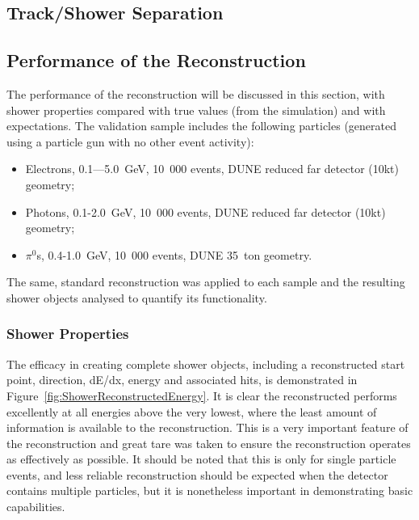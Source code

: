 \subsection{Track/Shower Separation}\label{sec:TrackShowerSeparation}

\subsection{Performance of the Reconstruction}\label{sec:ReconstructionPerformance}

The performance of the reconstruction will be discussed in this section, with shower properties compared with true values (from the simulation) and with expectations.  The validation sample includes the following particles (generated using a particle gun with no other event activity):
\begin{itemize}
  \item Electrons, 0.1—5.0~GeV, 10~000 events, DUNE reduced far detector (10kt) geometry;
  \item Photons, 0.1-2.0~GeV, 10~000 events, DUNE reduced far detector (10kt) geometry;
  \item $\pi^0$s, 0.4-1.0~GeV, 10~000 events, DUNE 35~ton geometry.
\end{itemize}
The same, standard reconstruction was applied to each sample and the resulting shower objects analysed to quantify its functionality.

\subsubsection{Shower Properties}\label{sec:ShowerProperties}

The efficacy in creating complete shower objects, including a reconstructed start point, direction, dE/dx, energy and associated hits, is demonstrated in Figure~\ref{fig:ShowerReconstructedEnergy}.  It is clear the reconstructed performs excellently at all energies above the very lowest, where the least amount of information is available to the reconstruction.  This is a very important feature of the reconstruction and great tare was taken to ensure the reconstruction operates as effectively as possible.  It should be noted that this is only for single particle events, and less reliable reconstruction should be expected when the detector contains multiple particles, but it is nonetheless important in demonstrating basic capabilities.

